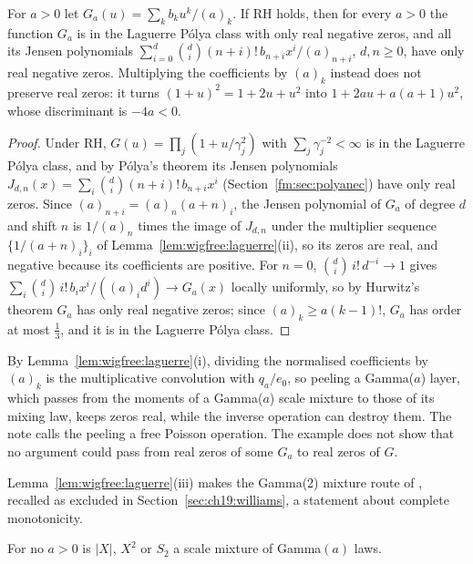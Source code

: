 \begin{proposition}\label{prop:wigfree:peel}
For $a>0$ let $G_a(u)=\sum_kb_ku^k/(a)_k$. If RH holds, then for every $a>0$ the function $G_a$ is in the Laguerre P\'olya class with only real negative zeros, and all its Jensen polynomials $\sum_{i=0}^d\binom di(n+i)!\,b_{n+i}x^i/(a)_{n+i}$, $d,n\ge0$, have only real negative zeros. Multiplying the coefficients by $(a)_k$ instead does not preserve real zeros: it turns $(1+u)^2=1+2u+u^2$ into $1+2au+a(a+1)u^2$, whose discriminant is $-4a<0$.
\end{proposition}

\begin{proof}
Under RH, $G(u)=\prod_j(1+u/\gamma_j^2)$ with $\sum_j\gamma_j^{-2}<\infty$ is in the Laguerre P\'olya class, and by P\'olya's theorem its Jensen polynomials $J_{d,n}(x)=\sum_i\binom di(n+i)!\,b_{n+i}x^i$ (Section~\ref{fm:sec:polyanec}) have only real zeros. Since $(a)_{n+i}=(a)_n(a+n)_i$, the Jensen polynomial of $G_a$ of degree $d$ and shift $n$ is $1/(a)_n$ times the image of $J_{d,n}$ under the multiplier sequence $\{1/(a+n)_i\}_i$ of Lemma~\ref{lem:wigfree:laguerre}(ii), so its zeros are real, and negative because its coefficients are positive. For $n=0$, $\binom di\,i!\,d^{-i}\to1$ gives $\sum_i\binom di\,i!\,b_ix^i/((a)_id^i)\to G_a(x)$ locally uniformly, so by Hurwitz's theorem $G_a$ has only real negative zeros; since $(a)_k\ge a(k-1)!$, $G_a$ has order at most $\frac13$, and it is in the Laguerre P\'olya class.
\end{proof}

By Lemma~\ref{lem:wigfree:laguerre}(i), dividing the normalised coefficients by $(a)_k$ is the multiplicative convolution with $q_a/e_0$, so peeling a Gamma($a$) layer, which passes from the moments of a Gamma($a$) scale mixture to those of its mixing law, keeps zeros real, while the inverse operation can destroy them. The note calls the peeling a free Poisson operation. The example does not show that no argument could pass from real zeros of some $G_a$ to real zeros of $G$.

Lemma~\ref{lem:wigfree:laguerre}(iii) makes the Gamma(2) mixture route of \cite[Section 12.6]{P26}, recalled as excluded in Section~\ref{sec:ch19:williams}, a statement about complete monotonicity.

\begin{theorem}\label{thm:wigfree:nomix}
For no $a>0$ is $|X|$, $X^2$ or $S_2$ a scale mixture of Gamma$(a)$ laws.
\end{theorem}

